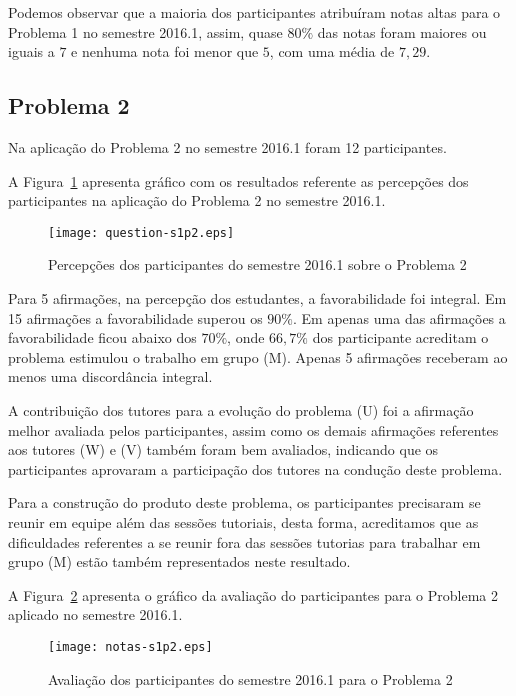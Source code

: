 Podemos observar que a maioria dos participantes atribuíram
notas altas para o Problema 1 no semestre 2016.1, assim, quase $80\%$ das notas
foram maiores ou iguais a $7$ e nenhuma nota foi menor que $5$, com uma média
de $7,29$.
  
\subsection{Problema 2}
Na aplicação do Problema 2 no semestre 2016.1 foram 12 participantes.

A Figura~\ref{percep-s1p2} apresenta gráfico com os resultados referente
as percepções dos participantes na aplicação do
Problema 2 no semestre 2016.1.

\begin{figure}[!htb]
\centering
\texttt{[image: question-s1p2.eps]}
\caption{Percepções dos participantes do semestre 2016.1 sobre o Problema 2}
\label{percep-s1p2}
\end{figure}

Para 5 afirmações, na percepção dos estudantes, a favorabilidade foi integral.
Em 15 afirmações a favorabilidade superou os $90\%$.
Em apenas uma das afirmações a favorabilidade ficou abaixo dos $70\%$, onde
$66,7\%$ dos participante acreditam o problema estimulou
o trabalho em grupo (M).
Apenas 5 afirmações receberam ao menos uma discordância integral.

A contribuição dos tutores para a evolução do problema (U) foi a
afirmação melhor avaliada pelos participantes, assim como os demais
afirmações referentes aos tutores (W) e (V) também foram bem avaliados,
indicando que os participantes aprovaram a participação
dos tutores na condução deste problema.

Para a construção do produto deste problema, os participantes
precisaram se reunir em equipe além das sessões tutoriais, desta forma,
acreditamos que as dificuldades referentes a se reunir fora das sessões tutorias
para trabalhar em grupo (M) estão também representados neste resultado.

A Figura~\ref{aval-s1p2} apresenta o gráfico da
avaliação do participantes para o Problema 2 aplicado no semestre 2016.1.

\begin{figure}[!htb]
\centering
\texttt{[image: notas-s1p2.eps]}
\caption{Avaliação dos participantes do semestre 2016.1 para o Problema 2}
\label{aval-s1p2}
\end{figure}

